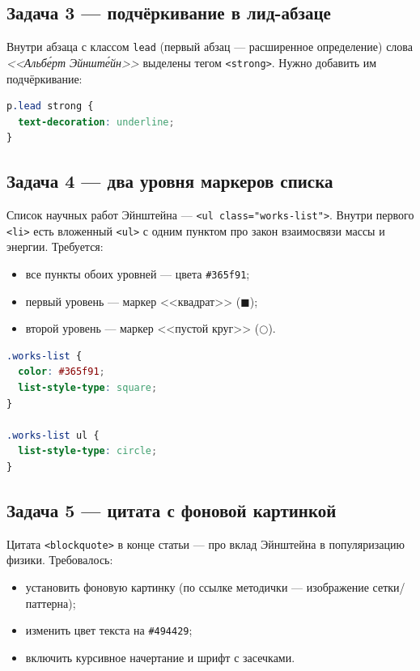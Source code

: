 \subsection{Задача 3 --- подчёркивание в лид-абзаце}

Внутри абзаца с классом \texttt{lead} (первый абзац --- расширенное
определение) слова \textit{<<Альбе́рт Эйнште́йн>>} выделены тегом
\texttt{<strong>}. Нужно добавить им подчёркивание:

\begin{lstlisting}[language=CSS]
p.lead strong {
  text-decoration: underline;
}
\end{lstlisting}

\subsection{Задача 4 --- два уровня маркеров списка}

Список научных работ Эйнштейна --- \texttt{<ul~class="works-list">}.
Внутри первого \texttt{<li>} есть вложенный \texttt{<ul>} с одним
пунктом про закон взаимосвязи массы и энергии. Требуется:
\begin{itemize}
  \item все пункты обоих уровней --- цвета \texttt{\#365f91};
  \item первый уровень --- маркер <<квадрат>> ($\blacksquare$);
  \item второй уровень --- маркер <<пустой круг>> ($\bigcirc$).
\end{itemize}

\begin{lstlisting}[language=CSS]
.works-list {
  color: #365f91;
  list-style-type: square;
}

.works-list ul {
  list-style-type: circle;
}
\end{lstlisting}

\subsection{Задача 5 --- цитата с фоновой картинкой}

Цитата \texttt{<blockquote>} в конце статьи --- про вклад
Эйнштейна в популяризацию физики. Требовалось:
\begin{itemize}
  \item установить фоновую картинку (по ссылке методички ---
        изображение сетки/паттерна);
  \item изменить цвет текста на \texttt{\#494429};
  \item включить курсивное начертание и шрифт с засечками.
\end{itemize}

